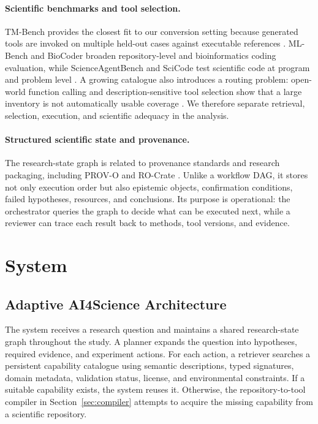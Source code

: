 \documentclass[letterpaper]{article} %
\begin{document}
\paragraph{Scientific benchmarks and tool selection.}
TM-Bench provides the closest fit to our conversion setting because generated tools are invoked on multiple held-out cases against executable references \citep{wolflein2025toolmaker}. ML-Bench and BioCoder broaden repository-level and bioinformatics coding evaluation, while ScienceAgentBench and SciCode test scientific code at program and problem level \citep{tang2024mlbench,tang2024biocoder,chen2025scienceagentbench,tian2024scicode}. A growing catalogue also introduces a routing problem: open-world function calling and description-sensitive tool selection show that a large inventory is not automatically usable coverage \citep{qin2025metatool,faghih2025toolpreferences}. We therefore separate retrieval, selection, execution, and scientific adequacy in the analysis.

\paragraph{Structured scientific state and provenance.}
The research-state graph is related to provenance standards and research packaging, including PROV-O and RO-Crate \citep{w3c2013prov,soilandreyes2022rocrate}. Unlike a workflow DAG, it stores not only execution order but also epistemic objects, confirmation conditions, failed hypotheses, resources, and conclusions. Its purpose is operational: the orchestrator queries the graph to decide what can be executed next, while a reviewer can trace each result back to methods, tool versions, and evidence.

\section{System}
\label{sec:system}

\subsection{Adaptive AI4Science Architecture}

The system receives a research question and maintains a shared research-state graph throughout the study. A planner expands the question into hypotheses, required evidence, and experiment actions. For each action, a retriever searches a persistent capability catalogue using semantic descriptions, typed signatures, domain metadata, validation status, license, and environmental constraints. If a suitable capability exists, the system reuses it. Otherwise, the repository-to-tool compiler in Section~\ref{sec:compiler} attempts to acquire the missing capability from a scientific repository.
\end{document}
